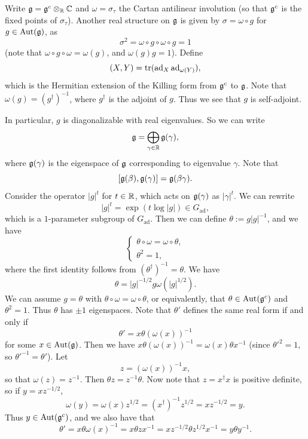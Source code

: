 \begin{remark}
  Write $\mathfrak{g} = \mathfrak{g}^c \otimes_{\mathbb{R}} \mathbb{C}$
  and $\omega = \sigma_\tau$ the Cartan
  antilinear involution (so that
  $\mathfrak{g}^c$ is the fixed points of $\sigma_\tau$).
  Another real structure on $\mathfrak{g}$ is given by
  $\sigma = \omega \circ g$ for
  $g \in \operatorname{Aut}(\mathfrak{g})$, as
  \[
    \sigma^2 = \omega \circ g \circ \omega \circ g
    = 1
  \]
  (note that $\omega \circ g \circ \omega = \omega(g)$, and $\omega(g) g = 1$).
  Define
  \[
    (X, Y)
    = \operatorname{tr}(\operatorname{ad}_X \operatorname{ad}_{\omega(Y)}),
  \]
  which is the Hermitian extension of
  the Killing form from $\mathfrak{g}^c$ to $\mathfrak{g}$.
  Note that $\omega(g) = (g^\dagger)^{-1}$, where $g^\dagger$ is the
  adjoint of $g$. Thus we see that
  $g$ is self-adjoint.
  \pagebreak

  In particular, $g$ is diagonalizable
  with real eigenvalues. So we can write
  \[
    \mathfrak{g} = \bigoplus_{\gamma \in \mathbb{R}}
    \mathfrak{g}(\gamma),
  \]
  where $\mathfrak{g}(\gamma)$ is the eigenspace of
  $\mathfrak{g}$ corresponding to eigenvalue
  $\gamma$. Note that
  \[
    [\mathfrak{g}(\beta), \mathfrak{g}(\gamma)]
    = \mathfrak{g}(\beta \gamma).
  \]
  Consider the operator $|g|^t$ for
  $t \in \mathbb{R}$, which acts on $\mathfrak{g}(\gamma)$ as
  $|\gamma|^t$. We can rewrite
  \[
    |g|^t
    = \exp(t \log |g|) \in G_{\mathrm{ad}},
  \]
  which is a $1$-parameter subgroup of $G_{\mathrm{ad}}$.
  Then we can define $\theta := g|g|^{-1}$,
  and we have
  \[
    \begin{cases}
      \theta \circ \omega = \omega \circ \theta, \\
      \theta^2 = 1,
    \end{cases}
  \]
  where the first identity follows from
  $(\theta^\dagger)^{-1} = \theta$.
  We have
  \[
    \theta = |g|^{-1 / 2} g \omega(|g|^{1 / 2}).
  \]
  We can assume $g = \theta$ with
  $\theta \circ \omega = \omega \circ \theta$,
  or equivalently, that $\theta \in \operatorname{Aut}(\mathfrak{g}^c)$
  and $\theta^2 = 1$.
  Thus $\theta$ has $\pm 1$ eigenspaces.
  Note that $\theta'$ defines the same
  real form if and only if
  \[
    \theta' = x \theta (\omega(x))^{-1}
  \]
  for some $x \in \operatorname{Aut}(\mathfrak{g})$. Then
  we have $x \theta(\omega(x))^{-1} = \omega(x) \theta x^{-1}$
  (since $\theta'^2 = 1$, so $\theta'^{-1} = \theta'$).
  Let
  \[
    z = (\omega(x))^{-1} x,
  \]
  so that $\omega(z) = z^{-1}$. Then
  $\theta z = z^{-1} \theta$. Now note that
  $z = x^\dagger x$ is positive definite,
  so if $y = xz^{-1 / 2}$,
  \[
    \omega(y)
    = \omega(x) z^{1 / 2}
    = (x^\dagger)^{-1} z^{1 / 2}
    = x z^{-1 / 2} = y.
  \]
  Thus $y \in \operatorname{Aut}(\mathfrak{g}^c)$,
  and we also have that
  \[
    \theta' = x \theta \omega(x)^{-1}
    = x \theta z x^{-1}
    = x z^{-1 / 2} \theta z^{1 / 2} x^{-1}
    = y \theta y^{-1}.
  \]
\end{remark}

